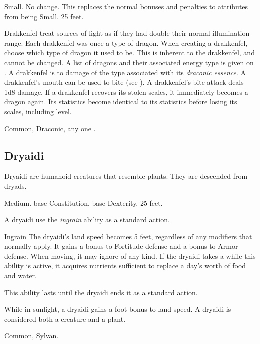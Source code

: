          Small.
         No change. This replaces the normal bonuses and penalties to attributes from being Small.
         25 feet.
        \begin{itemize}
             Drakkenfel treat sources of light as if they had double their normal illumination range.
             Each drakkenfel was once a type of dragon.
                When creating a drakkenfel, choose which type of dragon it used to be.
                This is inherent to the drakkenfel, and cannot be changed.
                A list of dragons and their associated energy type is given on .
             A drakkenfel is  to damage of the type associated with its \textit{draconic essence}.
             A drakkenfel's mouth can be used to bite (see ). A drakkenfel's bite attack deals 1d8 damage.
             If a drakkenfel recovers its stolen scales, it immediately becomes a dragon again.
                Its statistics become identical to its statistics before losing its scales, including level.
        \end{itemize}
         Common, Draconic, any one .

    \subsection{Dryaidi}

        Dryaidi are humanoid creatures that resemble plants. They are descended from dryads.

         Medium.
          base Constitution,  base Dexterity.
         25 feet.
        \begin{itemize}
             A dryaidi use the \textit{ingrain} ability as a standard action.
                \begin{freeability}{Ingrain}
                    The dryaidi's land speed becomes 5 feet, regardless of any modifiers that normally apply.
                    It gains a  bonus to Fortitude defense and a  bonus to Armor defense.
                    When moving, it may ignore  of any kind.
                    If the dryaidi takes a  while this ability is active, it acquires nutrients sufficient to replace a day's worth of food and water.

                    This ability lasts until the dryaidi ends it as a standard action.
                \end{freeability}
             While in sunlight, a dryaidi gains a  foot bonus to land speed.
             A dryaidi is considered both a creature and a plant.
        \end{itemize}
         Common, Sylvan.

